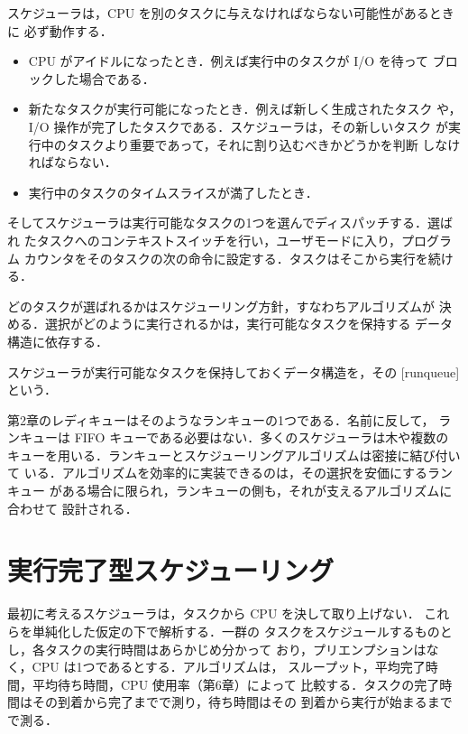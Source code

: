 \documentclass[../main.tex]{subfiles}
\begin{document}
スケジューラは，CPU を別のタスクに与えなければならない可能性があるときに
必ず動作する．
\begin{itemize}
  \item CPU がアイドルになったとき．例えば実行中のタスクが I/O を待って
    ブロックした場合である．
  \item 新たなタスクが実行可能になったとき．例えば新しく生成されたタスク
    や，I/O 操作が完了したタスクである．スケジューラは，その新しいタスク
    が実行中のタスクより重要であって，それに割り込むべきかどうかを判断
    しなければならない．
  \item 実行中のタスクのタイムスライスが満了したとき．
\end{itemize}
そしてスケジューラは実行可能なタスクの1つを選んでディスパッチする．選ばれ
たタスクへのコンテキストスイッチを行い，ユーザモードに入り，プログラム
カウンタをそのタスクの次の命令に設定する．タスクはそこから実行を続ける．

どのタスクが選ばれるかはスケジューリング方針，すなわちアルゴリズムが
決める．選択がどのように実行されるかは，実行可能なタスクを保持する
データ構造に依存する．

\begin{definition}[ランキュー]
  スケジューラが実行可能なタスクを保持しておくデータ構造を，その
  [runqueue]という．
\end{definition}

第2章のレディキューはそのようなランキューの1つである．名前に反して，
ランキューは FIFO キューである必要はない．多くのスケジューラは木や複数の
キューを用いる．ランキューとスケジューリングアルゴリズムは密接に結び付いて
いる．アルゴリズムを効率的に実装できるのは，その選択を安価にするランキュー
がある場合に限られ，ランキューの側も，それが支えるアルゴリズムに合わせて
設計される．

\section{実行完了型スケジューリング}
\label{sec:l07-rtc}

最初に考えるスケジューラは，タスクから CPU を決して取り上げない．
これらを単純化した仮定の下で解析する．一群の
タスクをスケジュールするものとし，各タスクの実行時間はあらかじめ分かって
おり，プリエンプションはなく，CPU は1つであるとする．アルゴリズムは，
スループット，平均完了時間，平均待ち時間，CPU 使用率（第6章）によって
比較する．タスクの完了時間はその到着から完了までで測り，待ち時間はその
到着から実行が始まるまでで測る．
\end{document}
